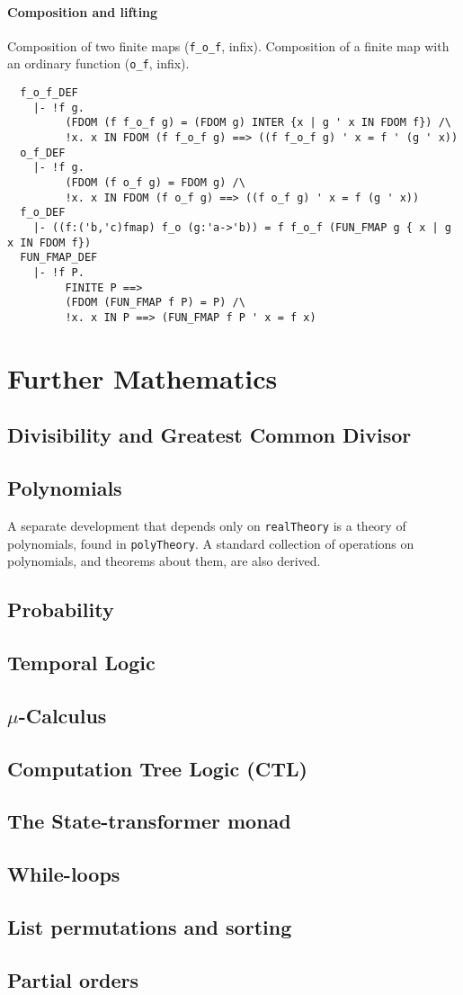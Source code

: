 \paragraph {Composition and lifting}
Composition of two finite maps (\verb+f_o_f+, infix). Composition of a
finite map with an ordinary function (\verb+o_f+, infix).

{\small
\begin{verbatim}
  f_o_f_DEF
    |- !f g.
         (FDOM (f f_o_f g) = (FDOM g) INTER {x | g ' x IN FDOM f}) /\
         !x. x IN FDOM (f f_o_f g) ==> ((f f_o_f g) ' x = f ' (g ' x))
  o_f_DEF
    |- !f g.
         (FDOM (f o_f g) = FDOM g) /\
         !x. x IN FDOM (f o_f g) ==> ((f o_f g) ' x = f (g ' x))
  f_o_DEF
    |- ((f:('b,'c)fmap) f_o (g:'a->'b)) = f f_o_f (FUN_FMAP g { x | g x IN FDOM f})
  FUN_FMAP_DEF
    |- !f P.
         FINITE P ==>
         (FDOM (FUN_FMAP f P) = P) /\
         !x. x IN P ==> (FUN_FMAP f P ' x = f x)
\end{verbatim}}

\section{Further Mathematics}

\subsection{Divisibility and Greatest Common Divisor}

\subsection{Polynomials}

A separate development that depends only on {\small\verb+realTheory+} is
a theory of polynomials, found in {\small\verb+polyTheory+}. A standard
collection of operations on polynomials, and theorems about them, are
also derived.

\subsection{Probability}
\subsection{Temporal Logic}
\subsection{$\mu$-Calculus}
\subsection{Computation Tree Logic (CTL)}
\subsection{The State-transformer monad}
\subsection{While-loops}
\subsection{List permutations and sorting}
\subsection{Partial orders}

